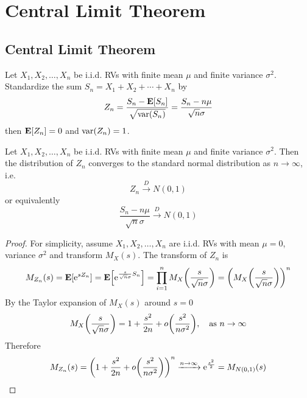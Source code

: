 \chapter{Central Limit Theorem}


\section{Central Limit Theorem}
Let $X_1, X_2, \ldots, X_n$ be i.i.d. RVs with finite mean $\mu$ and finite variance $\sigma^2$. Standardize the sum $S_n = X_1 + X_2 + \cdots + X_n$ by
\begin{equation}
    Z_n = \frac{S_n - \mathbf{E}[S_n]}{\sqrt{\mathrm{var}(S_n)}} = \frac{S_n - n\mu}{\sqrt{n}\sigma}
\end{equation}
then $\mathbf{E}[Z_n] = 0$ and $\mathrm{var}(Z_n) = 1$. 

\begin{theorem}
    Let $X_1, X_2, \ldots, X_n$ be i.i.d. RVs with finite mean $\mu$ and finite variance $\sigma^2$. Then the distribution of $Z_n$ converges to the standard normal distribution as $n \to \infty$, i.e.
    \begin{equation}
        Z_n \xrightarrow{D} N(0, 1)
    \end{equation}
    or equivalently
    \begin{equation}
        \frac{S_n - n\mu}{\sqrt{n}\sigma} \xrightarrow{D} N(0, 1)
    \end{equation}
\end{theorem}
\begin{proof}
    For simplicity, assume $X_1, X_2, \ldots, X_n$ are i.i.d. RVs with mean $\mu = 0$, variance $\sigma^2$ and transform $M_X(s)$. The transform of $Z_n$ is 
    \begin{equation}
        M_{Z_n}(s) = \mathbf{E}[\mathrm{e}^{sZ_n}] = \mathbf{E}\qty[\mathrm{e}^{\frac{s}{\sqrt{n}\sigma}S_n}] = \prod_{i=1}^{n} M_X\qty(\frac{s}{\sqrt{n}\sigma}) = \qty(M_X\qty(\frac{s}{\sqrt{n}\sigma}))^n
    \end{equation}
    By the Taylor expansion of $M_X(s)$ around $s = 0$
    \begin{equation}
        M_X\qty(\frac{s}{\sqrt{n}\sigma}) = 1 + \frac{s^2}{2n} + o\qty(\frac{s^2}{n\sigma^2}), \quad \text{as } n \to \infty
    \end{equation}
    Therefore
    \begin{equation}
        M_{Z_n}(s) = \qty(1 + \frac{s^2}{2n} + o\qty(\frac{s^2}{n\sigma^2}))^n \xrightarrow{n \to \infty} \mathrm{e}^{\frac{s^2}{2}} = M_{N(0, 1)}(s)
    \end{equation}
\end{proof}

